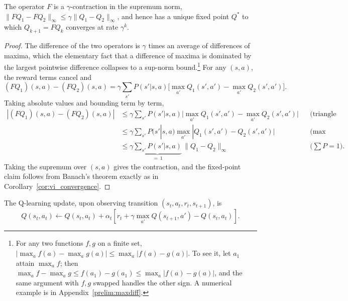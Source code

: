 \begin{theorem}
\label{thm:q_factor_contraction}
The operator $F$ is a $\gamma$-contraction in the supremum norm, $\|FQ_1 - FQ_2\|_\infty \leq \gamma \|Q_1 - Q_2\|_\infty$, and hence has a unique fixed point $Q^*$ to which $Q_{k+1} = FQ_k$ converges at rate $\gamma^k$.
\end{theorem}

\begin{proof}
The difference of the two operators is $\gamma$ times an average of differences of maxima, which the elementary fact that a difference of maxima is dominated by the largest pointwise difference collapses to a sup-norm bound.\footnote{For any two functions $f, g$ on a finite set, $|\max_a f(a) - \max_a g(a)| \leq \max_a |f(a) - g(a)|$. To see it, let $a_1$ attain $\max_a f$; then $\max_a f - \max_a g \leq f(a_1) - g(a_1) \leq \max_a |f(a) - g(a)|$, and the same argument with $f, g$ swapped handles the other sign. A numerical example is in Appendix~\ref{prelim:maxdiff}.} For any $(s,a)$, the reward terms cancel and
\[
(FQ_1)(s,a) - (FQ_2)(s,a) = \gamma \sum_{s'} P(s'|s,a) \big[ \max_{a'} Q_1(s',a') - \max_{a'} Q_2(s',a') \big].
\]
Taking absolute values and bounding term by term,
\begin{align*}
|(FQ_1)(s,a) - (FQ_2)(s,a)|
  &\leq \gamma \sum_{s'} P(s'|s,a) \big| \max_{a'} Q_1(s',a') - \max_{a'} Q_2(s',a') \big|
    && \text{(triangle ineq.)} \\
  &\leq \gamma \sum_{s'} P(s'|s,a) \max_{a'} |Q_1(s',a') - Q_2(s',a')|
    && \text{(max lemma)} \\
  &\leq \gamma \underbrace{\sum_{s'} P(s'|s,a)}_{=\,1}\, \|Q_1 - Q_2\|_\infty
    && \text{($\textstyle\sum P = 1$).}
\end{align*}
Taking the supremum over $(s,a)$ gives the contraction, and the fixed-point claim follows from Banach's theorem exactly as in Corollary~\ref{cor:vi_convergence}.
\end{proof}

The Q-learning update, upon observing transition $(s_t, a_t, r_t, s_{t+1})$, is
\begin{equation}
Q(s_t, a_t) \leftarrow Q(s_t, a_t) + \alpha_t \left[ r_t + \gamma \max_{a'} Q(s_{t+1}, a') - Q(s_t, a_t) \right].
\label{eq:qlearning}
\end{equation}

